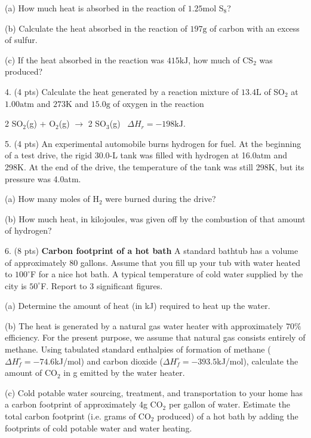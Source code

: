 \documentclass[11pt]{article}
\begin{document}
(a) How much heat is absorbed in the reaction of $1.25\text{mol}$ S$_8$?

(b) Calculate the heat absorbed in the reaction of $197\text{g}$ of carbon
with an excess of sulfur.

(c) If the heat absorbed in the reaction was $415\text{kJ}$, how much of CS$_2$
was produced?

\vspace{2in}

4. (4 pts) Calculate the heat generated by a reaction mixture of $13.4\text{L}$ of SO$_2$
at $1.00\text{atm}$ and $273\text{K}$ and $15.0\text{g}$ of oxygen in the reaction

\begin{center}
  2 SO$_2$(g) + O$_2$(g) $\rightarrow$ 2 SO$_3$(g) \, $\Delta H_r = -198\text{kJ}$.
\end{center}

\vspace{1in}

5. (4 pts) An experimental automobile burns hydrogen for fuel. At the beginning of a test
drive, the rigid 30.0-L tank was filled with hydrogen at 16.0atm and 298K. At the end of
the drive, the temperature of the tank was still 298K, but its pressure was 4.0atm.

(a) How many moles of H$_2$ were burned during the drive?

(b) How much heat, in kilojoules, was given off by the combustion of that amount of
hydrogen?

\vspace{1in}

6. (8 pts) \textbf{Carbon footprint of a hot bath} A standard bathtub has a volume of approximately
80 gallons. Assume that you fill up your tub with water heated to $100^\circ$F for a nice hot bath. 
A typical temperature of cold water supplied by the city is $50^\circ$F. Report to 3 significant figures.

(a) Determine the amount of heat (in kJ) required to heat up the water.

(b) The heat is generated by a natural gas water heater with approximately $70\%$ efficiency. 
For the present purpose, we assume that natural gas consists entirely of methane. Using tabulated
 standard enthalpies of formation of methane ($\Delta H_f^\circ = -74.6$kJ/mol) and carbon dioxide
($\Delta H_f^\circ = -393.5$kJ/mol), calculate the amount of CO$_2$ in  g emitted by the water heater.

(c) Cold potable water sourcing, treatment, and transportation to your home has a carbon footprint
 of approximately 4g CO$_2$ per gallon of water. Estimate the total carbon footprint (i.e. grams of
 CO$_2$ produced) of  a hot bath by adding the footprints of cold potable water and water heating.
\end{document}
